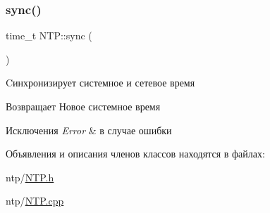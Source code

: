 \subsubsection{\texorpdfstring{sync()}{sync()}}
{\footnotesize\ttfamily time\+\_\+t N\+T\+P\+::sync (\begin{DoxyParamCaption}{ }\end{DoxyParamCaption})}



Cинхронизирует системное и сетевое время 

\begin{DoxyReturn}{Возвращает}
Новое системное время 
\end{DoxyReturn}

\begin{DoxyExceptions}{Исключения}
{\em Error} & в случае ошибки \\
\hline
\end{DoxyExceptions}


Объявления и описания членов классов находятся в файлах\+:\begin{DoxyCompactItemize}
\item 
ntp/\mbox{\hyperlink{NTP_8h}{N\+T\+P.\+h}}\item 
ntp/\mbox{\hyperlink{NTP_8cpp}{N\+T\+P.\+cpp}}\end{DoxyCompactItemize}

